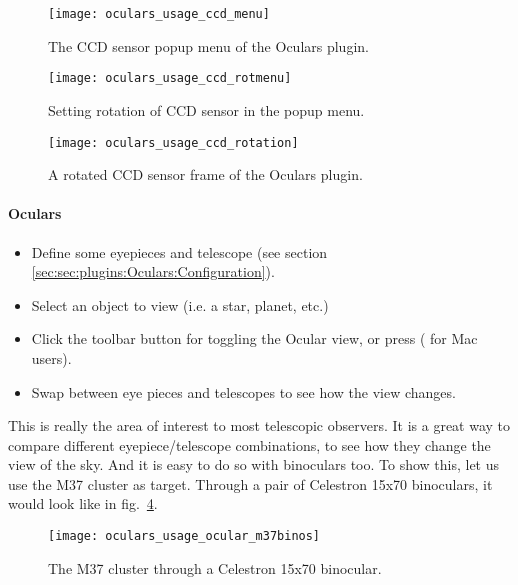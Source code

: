 \begin{figure}[p]\centering
\texttt{[image: oculars\_usage\_ccd\_menu]}
\caption{The CCD sensor popup menu of the Oculars plugin.}
\label{fig:plugins:Oculars:Usage:CCD:Menu}
\end{figure}

\begin{figure}[p]\centering
\texttt{[image: oculars\_usage\_ccd\_rotmenu]}
\caption{Setting rotation of CCD sensor in the popup menu.}
\label{fig:plugins:Oculars:Usage:CCD:RotMenu}
\end{figure}

\begin{figure}[p]\centering
\texttt{[image: oculars\_usage\_ccd\_rotation]}
\caption{A rotated CCD sensor frame of the Oculars plugin.}
\label{fig:plugins:Oculars:Usage:CCD:Rotation}
\end{figure}

\newpage


\paragraph{Oculars}

\begin{itemize}
\item Define some eyepieces and telescope (see section \ref{sec:sec:plugins:Oculars:Configuration}).
\item Select an object to view (i.e. a star, planet, etc.)
\item Click the toolbar button  for toggling the Ocular view, or press  ( for Mac users).
\item Swap between eye pieces and telescopes to see how the view changes.
\end{itemize}

This is really the area of interest to most telescopic observers. 
It is a great way to compare different eyepiece/telescope combinations, to see how they change the view of the sky. 
And it is easy to do so with binoculars too. 
To show this, let us use the M37 cluster as target. Through a pair of Celestron 15x70 binoculars, it would look like in fig.~\ref{fig:plugins:Oculars:Usage:Ocular:M37Binos}.

\begin{figure}[h]\centering
\texttt{[image: oculars\_usage\_ocular\_m37binos]}
\caption{The M37 cluster through a Celestron 15x70 binocular.}
\label{fig:plugins:Oculars:Usage:Ocular:M37Binos}
\end{figure}

